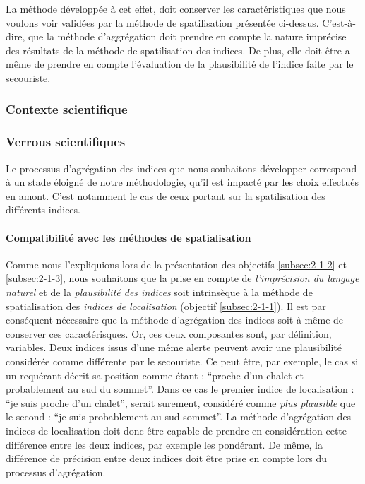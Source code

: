 La méthode développée à cet effet, doit conserver les caractéristiques
que nous voulons voir validées par la méthode de spatilisation
présentée ci-dessus. C'est-à-dire, que la méthode d'aggrégation doit
prendre en compte la nature imprécise des résultats de la méthode de
spatilisation des indices. De plus, elle doit être a-même de prendre
en compte l'évaluation de la plausibilité de l'indice faite par le
secouriste.

\subsubsection{Contexte scientifique}


\subsubsection{Verrous scientifiques}

Le processus d'agrégation des indices que nous souhaitons développer
correspond à un stade éloigné de notre méthodologie, \ie qu'il est
impacté par les choix effectués en amont. C'est notamment le cas de
ceux portant sur la spatilisation des différents indices.

\paragraph{Compatibilité avec les méthodes de spatialisation}

Comme nous l'expliquions lors de la présentation des objectifs
\ref{subsec:2-1-2} et \ref{subsec:2-1-3}, nous souhaitons que la prise
en compte de \emph{l'imprécision du langage naturel} et de la
\emph{plausibilité des indices} soit intrinsèque à la méthode de
spatialisation des \emph{indices de localisation} (objectif
\ref{subsec:2-1-1}). Il est par conséquent nécessaire que la méthode
d'agrégation des indices soit à même de conserver ces caractérisques.
% 
Or, ces deux composantes sont, par définition, variables. Deux indices
issus d'une même alerte peuvent avoir une plausibilité considérée
comme différente par le secouriste. Ce peut être, par exemple, le cas
si un requérant décrit sa position comme étant : \enquote{proche d'un
  chalet et probablement au sud du sommet}. Dans ce cas le premier
indice de localisation : \enquote{je suis proche d'un chalet}, serait
surement, considéré comme \emph{plus plausible} que le second :
\enquote{je suis probablement au sud sommet}. La méthode d'agrégation
des indices de localisation doit donc être capable de prendre en
considération cette différence entre les deux indices, par exemple les
pondérant. De même, la différence de précision entre deux indices doit
être prise en compte lors du processus d'agrégation.

